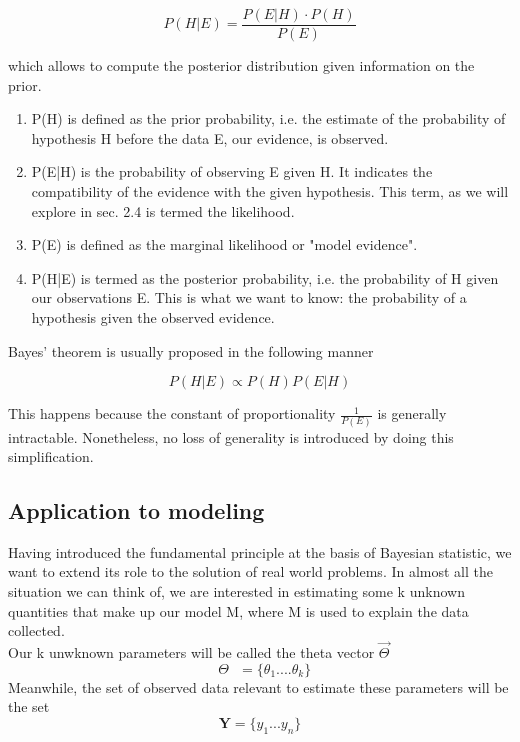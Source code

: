\documentclass[letterpaper]{article}
\begin{document}
\begin{equation}
P(H|E)=\frac{P(E|H)\cdot P(H)}{P(E)}
\end{equation}

which allows to compute the posterior distribution given information on the prior. \begin{enumerate}
\item P(H) is defined as the prior probability, i.e. the estimate of the probability of hypothesis H before the data E, our evidence, is observed.
\item P(E|H) is the probability of observing E given H. It indicates the compatibility of the evidence with the given hypothesis. This term, as we will explore in sec. 2.4 is termed the likelihood.
\item P(E) is defined as the marginal likelihood or "model evidence".
\item P(H|E) is termed as the posterior probability, i.e. the probability of H given our observations E. This is what we want to know: the probability of a hypothesis given the observed evidence.
\end{enumerate} 

Bayes' theorem is usually proposed in the following manner

\begin{equation}
P(H|E) \propto P(H)P(E|H)
\end{equation}

This happens because the constant of proportionality $\frac{1}{P(E)}$ is generally intractable. Nonetheless, no loss of generality is introduced by doing this simplification.

\subsection{Application to modeling}

Having introduced the fundamental principle at the basis of Bayesian statistic, we want to extend its role to the solution of real world problems. 
In almost all the situation we can think of, we are interested in estimating some k unknown quantities that make up our model M, where M is used to explain the data collected.\\
Our k unwknown parameters will be called the theta vector
$\vec{\Theta}$
\begin{equation*}
\textbf{ $\Theta$ } = \{ \theta_1 .... \theta_k \}
\end{equation*}
Meanwhile, the set of observed data relevant to estimate these parameters will be the set
\begin{equation*}
\textbf{Y}=\{y_1...y_n\}
\end{equation*}
\end{document}
